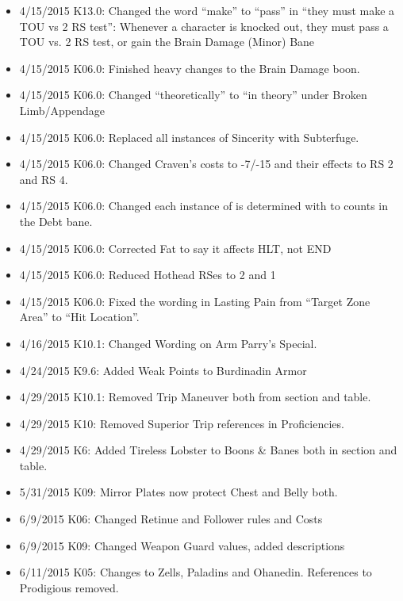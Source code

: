 \documentclass[oneside,11pt,english]{book}
\begin{document}
{\begin{itemize}
costs, and divide the result by 2, rounding up. Note that this is how it was in 1.9.3. Further added the line 
For their potentially unbalancing nature, all abnormal Social Class and Wealth combinations are subject 
to GM approval. Changed the Abnormal Social Class and Wealth Combinations table appropriately. 
Moved the spacing between the table and the large word Wealth to keep all the Wealth parts on 
the same page. 
\item 4/15/2015 K13.0: Changed the word “make” to “pass” in “they must make a TOU vs 2 RS test”: 
Whenever a character is knocked out, they must pass a TOU vs. 2 RS test, or gain the Brain Damage 
(Minor) Bane 
\item 4/15/2015 K06.0: Finished heavy changes to the Brain Damage boon. 
\item 4/15/2015 K06.0: Changed “theoretically” to “in theory” under Broken Limb/Appendage 
\item 4/15/2015 K06.0: Replaced all instances of Sincerity with Subterfuge. 
\item 4/15/2015 K06.0: Changed Craven’s costs to -7/-15 and their effects to RS 2 and RS 4. 
\item 4/15/2015 K06.0: Changed each instance of is determined with to counts in the Debt bane. 
\item 4/15/2015 K06.0: Corrected Fat to say it affects HLT, not END 
\item 4/15/2015 K06.0: Reduced Hothead RSes to 2 and 1 
\item 4/15/2015 K06.0: Fixed the wording in Lasting Pain from “Target Zone Area” to “Hit Location”. 
\item 4/16/2015 K10.1: Changed Wording on Arm Parry’s Special. 
\item 4/24/2015 K9.6: Added Weak Points to Burdinadin Armor 
\item 4/29/2015 K10.1: Removed Trip Maneuver both from section and table. 
\item 4/29/2015 K10: Removed Superior Trip references in Proficiencies. 
\item 4/29/2015 K6: Added Tireless Lobster to Boons \& Banes both in section and table. 
\item 5/31/2015 K09: Mirror Plates now protect Chest and Belly both. 
\item 6/9/2015 K06: Changed Retinue and Follower rules and Costs 
\item 6/9/2015 K09: Changed Weapon Guard values, added descriptions 
\item 6/11/2015 K05: Changes to Zells, Paladins and Ohanedin. References to Prodigious removed. 

\end{itemize}}
\end{document}
